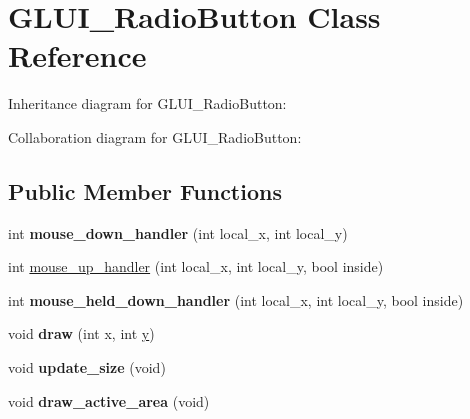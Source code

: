 \hypertarget{class_g_l_u_i___radio_button}{\section{G\+L\+U\+I\+\_\+\+Radio\+Button Class Reference}
\label{class_g_l_u_i___radio_button}
}


Inheritance diagram for G\+L\+U\+I\+\_\+\+Radio\+Button\+:


Collaboration diagram for G\+L\+U\+I\+\_\+\+Radio\+Button\+:
\subsection*{Public Member Functions}
\begin{DoxyCompactItemize}
\item 
\hypertarget{class_g_l_u_i___radio_button_a1043d967fe810f9b71b80d17152b977a}{int {\bfseries mouse\+\_\+down\+\_\+handler} (int local\+\_\+x, int local\+\_\+y)}\label{class_g_l_u_i___radio_button_a1043d967fe810f9b71b80d17152b977a}

\item 
int \hyperlink{class_g_l_u_i___radio_button_a2d6e08dc0802146227e8cd4f4d5ef571}{mouse\+\_\+up\+\_\+handler} (int local\+\_\+x, int local\+\_\+y, bool inside)
\item 
\hypertarget{class_g_l_u_i___radio_button_a7a5c7c04144139201848320c31f92844}{int {\bfseries mouse\+\_\+held\+\_\+down\+\_\+handler} (int local\+\_\+x, int local\+\_\+y, bool inside)}\label{class_g_l_u_i___radio_button_a7a5c7c04144139201848320c31f92844}

\item 
\hypertarget{class_g_l_u_i___radio_button_a21f6925f484831394a09e6f44dc8d11e}{void {\bfseries draw} (int x, int \hyperlink{_ice_utils_8h_aa7ffaed69623192258fb8679569ff9ba}{y})}\label{class_g_l_u_i___radio_button_a21f6925f484831394a09e6f44dc8d11e}

\item 
\hypertarget{class_g_l_u_i___radio_button_a18a5fd5c61bc61231df01972f85b464b}{void {\bfseries update\+\_\+size} (void)}\label{class_g_l_u_i___radio_button_a18a5fd5c61bc61231df01972f85b464b}

\item 
\hypertarget{class_g_l_u_i___radio_button_a0000fc6e9668323092c2acc0852851fb}{void {\bfseries draw\+\_\+active\+\_\+area} (void)}\label{class_g_l_u_i___radio_button_a0000fc6e9668323092c2acc0852851fb}


\end{DoxyCompactItemize}

